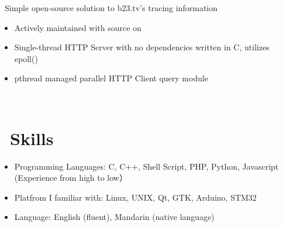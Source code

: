 \documentclass{resume}
\begin{document}
\ Simple open-source solution to b23.tv's tracing information
\begin{itemize}
\item Actively maintained with source on 
\item Single-thread HTTP Server with no dependencies written in C, utilizes epoll()
\item pthread managed parallel HTTP Client query module
\end{itemize}

\

\section{\faCogs\ Skills}
\begin{itemize}[parsep=0.5ex]
  \item Programming Languages: C, C++, Shell Script, PHP, Python, Javascript (Experience from high to low）
  \item Platfrom I familiar with: Linux, UNIX, Qt, GTK, Arduino, STM32
  \item Language: English (fluent), Mandarin (native language)
\end{itemize}
\end{document}
